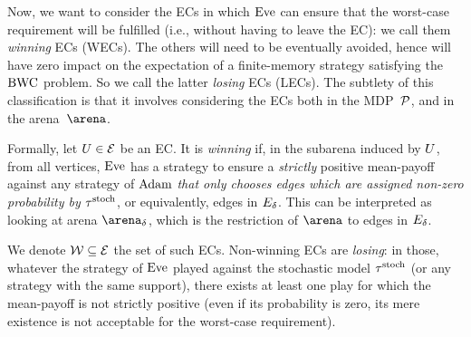 Now, we want to consider the ECs in which $\text{Eve}$ can ensure that the worst-case requirement will be fulfilled (i.e., without having to leave the EC): we call them \textit{winning} ECs (WECs). The others will need to be eventually avoided, hence will have zero impact on the expectation of a finite-memory strategy satisfying the $\text{BWC}$ problem. So we call the latter \textit{losing} ECs (LECs). The subtlety of this classification is that it involves considering the ECs both in the MDP~${\mathcal{P}}$, and in the arena~$\arena$.

Formally, let $U \in \mathcal{E}$ be an EC. It is \textit{winning} if, in the subarena induced by $U$, from all vertices, $\text{Eve}$ has a strategy to ensure a \textit{strictly} positive mean-payoff against any strategy of $\text{Adam}$ \textit{that only chooses edges which are assigned non-zero probability by $\tau^{\text{stoch}}$}, or equivalently, edges in $E_{\delta}$. This can be interpreted as looking at arena $\gameNonZero$, which is the restriction of $\arena$ to edges in $E_{\delta}$.

We denote $\mathcal{W} \subseteq \mathcal{E}$ the set of such ECs. Non-winning ECs are \textit{losing}: in those, whatever the strategy of $\text{Eve}$ played against the stochastic model $\tau^{\text{stoch}}$ (or any strategy with the same support), there exists at least one play for which the mean-payoff is not strictly positive (even if its probability is zero, its mere existence is not acceptable for the worst-case requirement).

